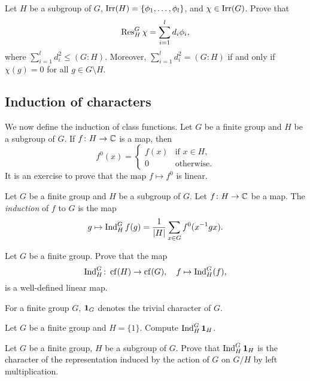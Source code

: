 \begin{exercise}
\label{xca:decomposing_restriction}
    Let $H$ be a subgroup of $G$, 
    $\operatorname{Irr}(H)=\{\phi_1,\dots,\phi_l\}$, 
    and $\chi\in\operatorname{Irr}(G)$. Prove that 
    \[
    \operatorname{Res}_H^G\chi=\sum_{i=1}^ld_i\phi_i,
    \]
    where $\sum_{i=1}^l d_i^2\leq (G:H)$. Moreover,  $\sum_{i=1}^l d_i^2=(G:H)$ 
    if and only if $\chi(g)=0$ for all $g\in G\setminus H$. 
\end{exercise}

\subsection{Induction of characters}

We now define the induction of class functions. Let $G$ be a finite group
and $H$ be a subgroup of $G$. If $f\colon H\to\mathbb{C}$ is a map, 
then 
\[
f^0(x)=\begin{cases}
    f(x) & \text{if $x\in H$},\\
    0 & \text{otherwise}.
    \end{cases}
\]
It is an exercise to prove that
the map $f\mapsto f^0$ is linear. 

\begin{definition}
    Let $G$ be a finite group and $H$ be a subgroup of $G$. Let
    $f\colon H\to\mathbb{C}$ be
    a map. The \emph{induction}
    of $f$ to $G$ is the map 
    \begin{align*}
      g\mapsto\operatorname{Ind}_H^Gf(g)=\frac{1}{|H|}\sum_{x\in G}f^0(x^{-1}gx).
    \end{align*}
\end{definition}

\begin{exercise}
\label{xca:induction}
    Let $G$ be a finite group. Prove that
    the map 
    \[
    \operatorname{Ind}_H^G\colon\operatorname{cf}(H)\to\operatorname{cf}(G),\quad  f\mapsto\operatorname{Ind}_H^G(f),
    \]
    is a well-defined linear map. 
\end{exercise}

For a finite group $G$, $\mathbf{1}_G$ denotes the
trivial character of $G$. 

\begin{exercise}
\label{xca:inducting_trivial}
    Let $G$ be a finite group and $H=\{1\}$. Compute
    $\operatorname{Ind}_H^G\mathbf{1}_H$. 
\end{exercise}

\begin{exercise}
\label{xca:induction_G/H}
    Let $G$ be a finite group, $H$ be a 
    subgroup of $G$. Prove that
    $\operatorname{Ind}_H^G\mathbf{1}_H$ is the character of the
    representation induced by the action of $G$ on $G/H$ by left multiplication. 
\end{exercise}


